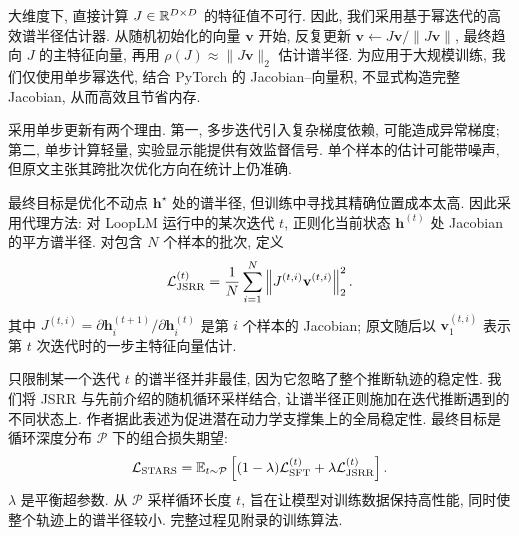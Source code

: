 大维度下, 直接计算 $J\in\mathbb R^{D\times D}$ 的特征值不可行. 因此, 我们采用基于幂迭代的高效谱半径估计器. 从随机初始化的向量 $\mathbf v$ 开始, 反复更新 $\mathbf v\leftarrow J\mathbf v/\|J\mathbf v\|$, 最终趋向 $J$ 的主特征向量, 再用 $\rho(J)\approx\|J\mathbf v\|_2$ 估计谱半径. 为应用于大规模训练, 我们仅使用单步幂迭代, 结合 PyTorch 的 Jacobian--向量积, 不显式构造完整 Jacobian, 从而高效且节省内存.

采用单步更新有两个理由. 第一, 多步迭代引入复杂梯度依赖, 可能造成异常梯度; 第二, 单步计算轻量, 实验显示能提供有效监督信号. 单个样本的估计可能带噪声, 但原文主张其跨批次优化方向在统计上仍准确.

最终目标是优化不动点 $\mathbf h^\star$ 处的谱半径, 但训练中寻找其精确位置成本太高. 因此采用代理方法: 对 LoopLM 运行中的某次迭代 $t$, 正则化当前状态 $\mathbf h^{(t)}$ 处 Jacobian 的平方谱半径. 对包含 $N$ 个样本的批次, 定义
\begin{equation}\label{stars-eq-3}
\mathcal L_{\rm JSRR}^{(t)}=\frac1N\sum_{i=1}^N
\left\|J^{(t,i)}\mathbf v^{(t,i)}\right\|_2^2.
\end{equation}
其中 $J^{(t,i)}=\partial\mathbf h_i^{(t+1)}/\partial\mathbf h_i^{(t)}$ 是第 $i$ 个样本的 Jacobian; 原文随后以 $\mathbf v_1^{(t,i)}$ 表示第 $t$ 次迭代时的一步主特征向量估计.

只限制某一个迭代 $t$ 的谱半径并非最佳, 因为它忽略了整个推断轨迹的稳定性. 我们将 JSRR 与先前介绍的随机循环采样结合, 让谱半径正则施加在迭代推断遇到的不同状态上. 作者据此表述为促进潜在动力学支撑集上的全局稳定性. 最终目标是循环深度分布 $\mathcal P$ 下的组合损失期望:
\begin{equation}\label{stars-eq-4}
\mathcal L_{\rm STARS}=\mathbb E_{t\sim\mathcal P}
\left[(1-\lambda)\mathcal L_{\rm SFT}^{(t)}+\lambda\mathcal L_{\rm JSRR}^{(t)}\right].
\end{equation}
$\lambda$ 是平衡超参数. 从 $\mathcal P$ 采样循环长度 $t$, 旨在让模型对训练数据保持高性能, 同时使整个轨迹上的谱半径较小. 完整过程见附录的训练算法.

